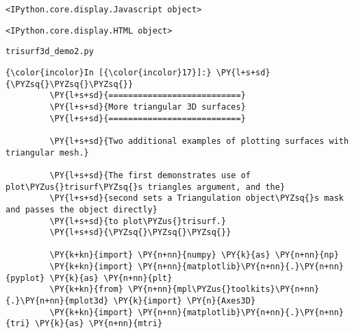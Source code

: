 

    
    \begin{verbatim}
<IPython.core.display.Javascript object>
    \end{verbatim}

    
    
    \begin{verbatim}
<IPython.core.display.HTML object>
    \end{verbatim}

    
    \texttt{trisurf3d\_demo2.py}

    \begin{Verbatim}[commandchars=\\\{\},frame=single,framerule=0.3mm,rulecolor=\color{cellframecolor}]
{\color{incolor}In [{\color{incolor}17}]:} \PY{l+s+sd}{\PYZsq{}\PYZsq{}\PYZsq{}}
         \PY{l+s+sd}{===========================}
         \PY{l+s+sd}{More triangular 3D surfaces}
         \PY{l+s+sd}{===========================}
         
         \PY{l+s+sd}{Two additional examples of plotting surfaces with triangular mesh.}
         
         \PY{l+s+sd}{The first demonstrates use of plot\PYZus{}trisurf\PYZsq{}s triangles argument, and the}
         \PY{l+s+sd}{second sets a Triangulation object\PYZsq{}s mask and passes the object directly}
         \PY{l+s+sd}{to plot\PYZus{}trisurf.}
         \PY{l+s+sd}{\PYZsq{}\PYZsq{}\PYZsq{}}
         
         \PY{k+kn}{import} \PY{n+nn}{numpy} \PY{k}{as} \PY{n+nn}{np}
         \PY{k+kn}{import} \PY{n+nn}{matplotlib}\PY{n+nn}{.}\PY{n+nn}{pyplot} \PY{k}{as} \PY{n+nn}{plt}
         \PY{k+kn}{from} \PY{n+nn}{mpl\PYZus{}toolkits}\PY{n+nn}{.}\PY{n+nn}{mplot3d} \PY{k}{import} \PY{n}{Axes3D}
         \PY{k+kn}{import} \PY{n+nn}{matplotlib}\PY{n+nn}{.}\PY{n+nn}{tri} \PY{k}{as} \PY{n+nn}{mtri}
\end{Verbatim}


